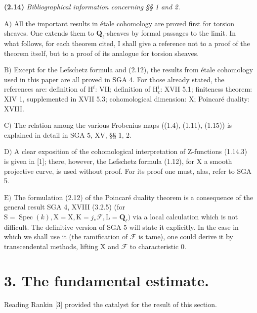 \documentclass[10pt,leqno]{article}
\begin{document}
\noindent \textbf{(2.14)} \emph{Bibliographical information concerning §§ 1 and 2.}\par

\noindent \(\mathrm{A})\) All the important results in étale cohomology are proved first for torsion sheaves. One extends them to \(\mathbf{Q}_{\ell }\)-sheaves by formal passages to the limit. In what follows, for each theorem cited, I shall give a reference not to a proof of the theorem itself, but to a proof of its analogue for torsion sheaves.\par

\noindent \(\mathrm{B})\) Except for the Lefschetz formula and (2.12), the results from étale cohomology used in this paper are all proved in SGA 4. For those already stated, the references are: definition of \(\mathrm{H}^{i}\): VII; definition of \(\mathrm{H}_{c}^{i}\): XVII 5.1; finiteness theorem: XIV 1, supplemented in XVII 5.3; cohomological dimension: \(\mathrm{X}\); Poincaré duality: XVIII.\par

\noindent \(\mathrm{C})\) The relation among the various Frobenius maps ((1.4), (1.11), (1.15)) is explained in detail in SGA 5, XV, §§ 1, 2.\par

\noindent \(\mathrm{D})\) A clear exposition of the cohomological interpretation of Z-functions (1.14.3) is given in [1]; there, however, the Lefschetz formula (1.12), for \(\mathrm{X}\) a smooth projective curve, is used without proof. For its proof one must, alas, refer to SGA 5.\par

\noindent \(\mathrm{E})\) The formulation (2.12) of the Poincaré duality theorem is a consequence of the general result SGA 4, XVIII (3.2.5) (for \(\mathrm{S}=\operatorname{Spec}(k), \mathrm{X}=\mathrm{X}, \mathrm{K}=j_{*}\mathcal{F} , \mathrm{L}=\mathbf{Q}_{\ell })\) via a local calculation which is not difficult. The definitive version of SGA 5 will state it explicitly. In the case in which we shall use it (the ramification of \(\mathcal{F} \) is tame), one could derive it by transcendental methods, lifting \(\mathrm{X}\) and \(\mathcal{F} \) to characteristic 0.\par

\section*{3. The fundamental estimate.}

\noindent Reading Rankin [3] provided the catalyst for the result of this section.\par
\end{document}
